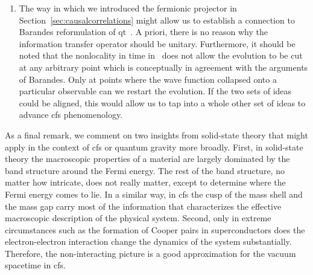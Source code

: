 \documentclass[reqno,11pt]{amsart}
\numberwithin{equation}{section}
\begin{document}
\begin{enumerate}
\item The way in which we introduced the fermionic projector in Section~\ref{sec:causalcorrelations} might allow us to establish a connection to Barandes reformulation of \ac{qt}~\cite{barandes2023stochasticquantumcorrespondence,barandes2024newprospectscausallylocal}. A priori, there is no reason why the information transfer operator should be unitary. Furthermore, it should be noted that the nonlocality in time in~\cite{finster2024causal} does not allow the evolution to be cut at any arbitrary point which is conceptually in agreement with the arguments of Barandes. Only at points where the wave function collapsed onto a particular observable can we restart the evolution. If the two sets of ideas could be aligned, this would allow us to tap into a whole other set of ideas to advance \ac{cfs} phenomenology.

\end{enumerate}


As a final remark, we comment on two insights from solid-state theory that might apply in the context of \ac{cfs} or quantum gravity more broadly. First, in solid-state theory the macroscopic properties of a material are largely dominated by the band structure around the Fermi energy. The rest of the band structure, no matter how intricate, does not really matter, except to determine where the Fermi energy comes to lie. In a similar way, in \ac{cfs} the cusp of the mass shell and the mass gap carry most of the information that characterizes the effective macroscopic description of the physical system. Second, only in extreme circumstances such as the formation
of Cooper pairs in superconductors does the electron-electron interaction change the dynamics of the system substantially. Therefore, the non-interacting picture is a good approximation for the vacuum spacetime in \ac{cfs}.
%  

 \printbibliography    
\end{document}
